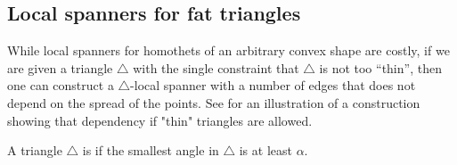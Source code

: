 \documentclass[12pt]{article}%
\begin{document}

\subsection{Local spanners for fat triangles}


While local spanners for homothets of an arbitrary convex shape are
costly, if we are given a triangle $\triangle$ with the single
constraint that $\triangle$ is not too ``thin'', then one can
construct a $\triangle$-local spanner with a number of edges that does
not depend on the spread of the points. See  for an
illustration of a construction showing that dependency if "thin"
triangles are allowed.



\begin{defn}
    A triangle $\triangle$ is  if the smallest
    angle in $\triangle$ is at least $\alpha$.
\end{defn}
\end{document}
